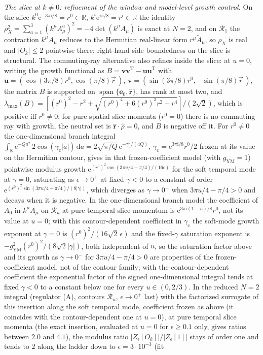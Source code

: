 \emph{The slice at \(k\ne0\): refinement of the window and model-level growth control.} On the slice \(k^0\mathrm e^{-3\pi\mathrm i/8}=r^0\in\mathbb R\), \(k^i\mathrm e^{\pi\mathrm i/8}=r^i\in\mathbb R\) the identity \(\rho_X^2=\sum_{a=1}^{3}{(k^\mu A^a_\mu)}^2=-4\det(k^\mu A_\mu)\) is exact at \(N=2\), and on \(\mathcal R_1\) the contraction \(k^\mu A_\mu\) reduces to the Hermitian real-linear form \(r^\mu\tilde A_\mu\), so \(\rho_X\) is real and \(|O_k|\le2\) pointwise there; right-hand-side boundedness on the slice is structural. The commuting-ray alternative also refines inside the slice: at \(u=0\), writing the growth functional as \(B=\mathbf v\mathbf v^{\mathrm T}-\mathbf u\mathbf u^{\mathrm T}\) with \(\mathbf u=(\cos(3\pi/8)r^0,\cos(\pi/8)\vec r\,)\), \(\mathbf v=(\sin(3\pi/8)r^0,-\sin(\pi/8)\vec r\,)\), the matrix \(B\) is supported on \(\operatorname{span}\{\mathbf e_0,\hat{\mathbf r}\}\), has rank at most two, and \(\lambda_{\max}(B)=[{(r^0)}^2-r^2+\sqrt{{(r^0)}^4+6{(r^0)}^2r^2+r^4}]/(2\sqrt2)\), which is positive iff \(r^0\ne0\); for pure spatial slice momenta (\(r^0=0\)) there is no commuting ray with growth, the neutral set is \(\hat{\mathbf r}\cdot\hat\rho=0\), and \(B\) is negative off it. For \(r^0\ne0\) the one-dimensional branch integral \(\int_{\mathbb R}\mathrm e^{-Qa^2}\,2\cos(\gamma_{\mathrm c}|a|)\,\mathrm da=2\sqrt{\pi/Q}\,\mathrm e^{-\gamma_{\mathrm c}^2/(4Q)}\), \(\gamma_{\mathrm c}=\mathrm e^{3\pi\mathrm i/8}r^0/2\) frozen at its value on the Hermitian contour, gives in that frozen-coefficient model (with \(g_{\mathrm{YM}}=1\)) pointwise modulus growth \(\mathrm e^{{(r^0)}^2\cos(3\pi u/4-\pi/4)/(16\epsilon)}\) for the soft temporal mode at \(\gamma=0\), saturating as \(\epsilon\to0^+\) at fixed \(\gamma<0\) to a constant of order \(\mathrm e^{{(r^0)}^2\sin(3\pi u/4-\pi/4)/(8|\gamma|)}\), which diverges as \(\gamma\to0^-\) when \(3\pi u/4-\pi/4>0\) and decays when it is negative. In the one-dimensional branch model the coefficient of \(\tilde A_0\) in \(k^\mu A_\mu\) on \(\mathcal R_u\) at pure temporal slice momentum is \(\mathrm e^{3\pi\mathrm i(1-u)/8}r^0\), not its value at \(u=0\); with this contour-dependent coefficient in \(\gamma_{\mathrm c}\) the soft-mode growth exponent at \(\gamma=0\) is \({(r^0)}^2/(16\sqrt2\,\epsilon)\) and the fixed-\(\gamma\) saturation exponent is \(-g_{\mathrm{YM}}^2{(r^0)}^2/(8\sqrt2|\gamma|)\), both independent of \(u\), so the saturation factor above and its growth as \(\gamma\to0^-\) for \(3\pi u/4-\pi/4>0\) are properties of the frozen-coefficient model, not of the contour family; with the contour-dependent coefficient the exponential factor of the signed one-dimensional integral tends at fixed \(\gamma<0\) to a constant below one for every \(u\in(0,2/3)\). In the reduced \(N=2\) integral (regulator (A), contours \(\mathcal R_u\), \(\epsilon\to0^+\) last) with the factorized surrogate of this insertion along the soft temporal mode, coefficient frozen as above (it coincides with the contour-dependent one at \(u=0\)), at pure temporal slice momenta (the exact insertion, evaluated at \(u=0\) for \(\epsilon\ge0.1\) only, gives ratios between \(2.0\) and \(4.1\)), the modulus ratio \(|Z_\epsilon[O_k]|/|Z_\epsilon[1]|\) stays of order one and tends to \(2\) along the ladder down to \(\epsilon=3\cdot10^{-3}\) (fit 